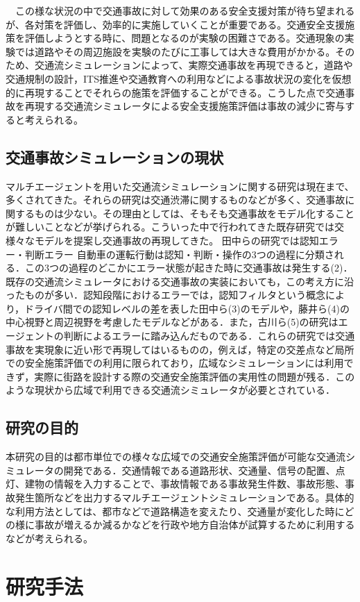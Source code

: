 \documentclass[14pt,a4j]{jsarticle}
\begin{document}
　この様な状況の中で交通事故に対して効果のある安全支援対策が待ち望まれるが、各対策を評価し、効率的に実施していくことが重要である。交通安全支援施策を評価しようとする時に、問題となるのが実験の困難さである。交通現象の実験では道路やその周辺施設を実験のたびに工事しては大きな費用がかかる。そのため、交通流シミュレーションによって、実際交通事故を再現できると，道路や交通規制の設計，ITS推進や交通教育への利用などによる事故状況の変化を仮想的に再現することでそれらの施策を評価することができる。こうした点で交通事故を再現する交通流シミュレータによる安全支援施策評価は事故の減少に寄与すると考えられる。
\subsection{交通事故シミュレーションの現状}
マルチエージェントを用いた交通流シミュレーションに関する研究は現在まで、多くされてきた。それらの研究は交通渋滞に関するものなどが多く、交通事故に関するものは少ない。その理由としては、そもそも交通事故をモデル化することが難しいことなどが挙げられる。こういった中で行われてきた既存研究では交様々なモデルを提案し交通事故の再現してきた。
田中らの研究では認知エラー・判断エラー
自動車の運転行動は認知・判断・操作の3つの過程に分類される．この3つの過程のどこかにエラー状態が起きた時に交通事故は発生する(2)．既存の交通流シミュレータにおける交通事故の実装においても，この考え方に沿ったものが多い．認知段階におけるエラーでは，認知フィルタという概念により，ドライバ間での認知レベルの差を表した田中ら(3)のモデルや，藤井ら(4)の中心視野と周辺視野を考慮したモデルなどがある．また，古川ら(5)の研究はエージェントの判断によるエラーに踏み込んだものである．これらの研究では交通事故を実現象に近い形で再現してはいるものの，例えば，特定の交差点など局所での安全施策評価での利用に限られており，広域なシミュレーションには利用できず，実際に街路を設計する際の交通安全施策評価の実用性の問題が残る．このような現状から広域で利用できる交通流シミュレータが必要とされている．
\subsection{研究の目的}
本研究の目的は都市単位での様々な広域での交通安全施策評価が可能な交通流シミュレータの開発である．交通情報である道路形状、交通量、信号の配置、点灯、建物の情報を入力することで、事故情報である事故発生件数、事故形態、事故発生箇所などを出力するマルチエージェントシミュレーションである。具体的な利用方法としては、都市などで道路構造を変えたり、交通量が変化した時にどの様に事故が増えるか減るかなどを行政や地方自治体が試算するために利用するなどが考えられる。
\newpage
\section{研究手法}
\end{document}
